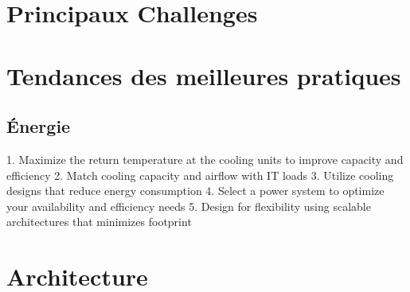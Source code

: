 \section{Principaux Challenges}


\section{Tendances des meilleures pratiques}

\subsection{Énergie}
1. Maximize the return temperature at the cooling units to improve capacity and efficiency
2. Match cooling capacity and airflow with IT loads
3. Utilize cooling designs that reduce energy consumption
4. Select a power system to optimize your availability and efficiency needs
5. Design for flexibility using scalable architectures that minimizes footprint

\section{Architecture}

